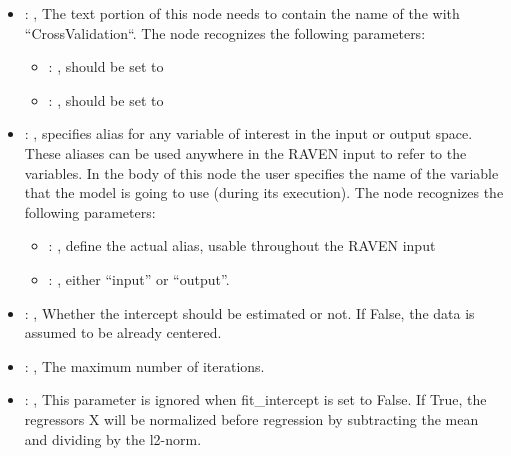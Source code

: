 \begin{itemize}
    \item {}: , 
      The text portion of this node needs to contain the name of the  with
               ``CrossValidation``.
      The  node recognizes the following parameters:
        \begin{itemize}
          \item {}: , 
            should be set to 
          \item {}: , 
            should be set to 
      \end{itemize}

    \item {}: , 
      specifies alias for         any variable of interest in the input or output space. These
      aliases can be used anywhere in the RAVEN input to         refer to the variables. In the body
      of this node the user specifies the name of the variable that the model is going to use
      (during its execution).
      The  node recognizes the following parameters:
        \begin{itemize}
          \item {}: , 
            define the actual alias, usable throughout the RAVEN input
          \item {}: , 
            either ``input'' or ``output''.
      \end{itemize}

    \item {}: , 
      Whether the intercept should be estimated or not. If False,
      the data is assumed to be already centered.

    \item {}: , 
      The maximum number of iterations.

    \item {}: , 
      This parameter is ignored when fit\_intercept is set to False. If True,
      the regressors X will be normalized before regression by subtracting the mean and
      dividing by the l2-norm.


\end{itemize}
